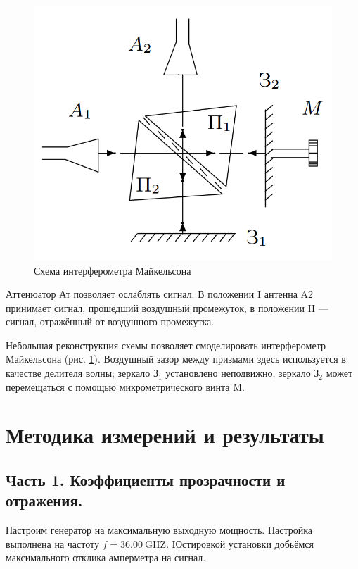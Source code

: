 \documentclass[12pt, a4paper]{article}
\newcommand{\GHz}{~\mathrm{GHZ}}
\begin{document}
\begin{figure}
  \vspace{-18mm}
  \begin{center}
    \includegraphics[width=0.90\linewidth]{pics/setup-2.png}
  \end{center}
  \vspace{-8mm}
  \caption{Схема интерферометра Майкельсона}
  \label{pic:interferometer}
\end{figure}
Аттенюатор Ат позволяет ослаблять сигнал. В положении I антенна A2 принимает сигнал,
прошедший воздушный промежуток, в положении II — сигнал, отражённый от воздушного 
промежутка.

Небольшая реконструкция схемы позволяет смоделировать интерферометр Майкельсона 
(рис. \ref{pic:interferometer}). Воздушный зазор между призмами здесь используется
в качестве делителя волны; зеркало $З_1$ установлено неподвижно, зеркало $З_2$ 
может перемещаться с помощью микрометрического винта M.

\section{Методика измерений и результаты}

\subsection{Часть 1. Коэффициенты прозрачности и отражения.}
Настроим генератор на максимальную выходную мощность. Настройка выполнена на частоту
$f = 36.00\GHz$. Юстировкой установки добьёмся максимального отклика амперметра на сигнал.
\end{document}
